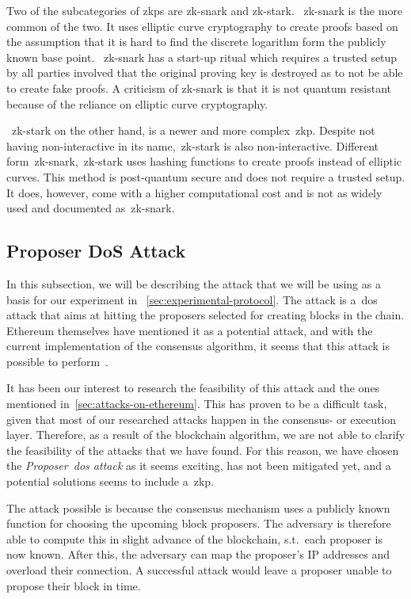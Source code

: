 Two of the subcategories of \gls{zkp}s are \gls{zk-snark} and \gls{zk-stark}.
~\gls{zk-snark} is the more common of the two.
It uses elliptic curve cryptography to create proofs based on the assumption that it is hard to find the discrete logarithm form the publicly known base point.
~\gls{zk-snark} has a start-up ritual which requires a trusted setup by all parties involved that the original proving key is destroyed as to not be able to create fake proofs.
A criticism of \gls{zk-snark} is that it is not quantum resistant because of the reliance on elliptic curve cryptography.

~\gls{zk-stark} on the other hand, is a newer and more complex~\gls{zkp}.
Despite not having non-interactive in its name,~\gls{zk-stark} is also non-interactive.
Different form~\gls{zk-snark},~\gls{zk-stark} uses hashing functions to create proofs instead of elliptic curves.
This method is post-quantum secure and does not require a trusted setup.
It does, however, come with a higher computational cost and is not as widely used and documented as~\gls{zk-snark}.

\subsection{Proposer DoS Attack}\label{subsec:proposer-dos-attack}
In this subsection, we will be describing the attack that we will be using as a basis for our experiment in ~\autoref{sec:experimental-protocol}.
The attack is a~\gls{dos} attack that aims at hitting the proposers selected for creating blocks in the chain.
Ethereum themselves have mentioned it as a potential attack, and with the current implementation of the consensus algorithm, it seems that this attack is possible to perform~\cite{EthereumSSLE2024,EthereumAttackDefense2024}.

It has been our interest to research the feasibility of this attack and the ones mentioned in~\autoref{sec:attacks-on-ethereum}.
This has proven to be a difficult task, given that most of our researched attacks happen in the consensus- or execution layer.
Therefore, as a result of the blockchain algorithm, we are not able to clarify the feasibility of the attacks that we have found.
For this reason, we have chosen the \textit{Proposer~\gls{dos} attack} as it seems exciting, has not been mitigated yet, and a potential solutions seems to include a~\gls{zkp}.

The attack possible is because the consensus mechanism uses a publicly known function for choosing the upcoming block proposers.
The adversary is therefore able to compute this in slight advance of the blockchain, s.t.\ each proposer is now known.
After this, the adversary can map the proposer's IP addresses and overload their connection.
A successful attack would leave a proposer unable to propose their block in time.
